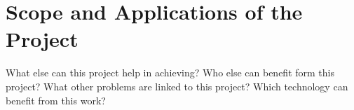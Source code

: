 \section{Scope and Applications of the Project}
What else can this project help in achieving? Who else can benefit form this project? What other problems are linked to this project? Which technology can benefit from this work?  